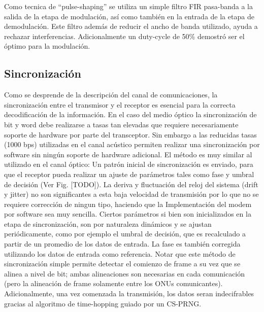 Como tecnica de ``pulse-shaping'' se utiliza un simple filtro FIR pasa-banda a la salida de la etapa de modulación, así como también en la entrada de la etapa de demodulación. Este filtro además de reducir el ancho de banda utilizado, ayuda a rechazar interferencias.
Adicionalmente un duty-cycle de 50\% demostró ser el óptimo para la modulación.

\subsection{Sincronización}
Como se desprende de la descripción del canal de comunicaciones, la sincronización entre el transmisor y el receptor es esencial para la correcta decodificación de la información. 
En el caso del medio óptico la sincronización de bit y word debe realizarse a tasas tan elevadas que requiere necesariamente soporte de hardware por parte del transceptor.
Sin embargo a las reducidas tasas (1000 bps) utilizadas en el canal acústico permiten realizar una sincronización por software sin ningún soporte de hardware adicional. 
El método es muy similar al utilizado en el canal óptico: Un patrón inicial de sincronización es enviado, para que el receptor pueda realizar un ajuste de parámetros tales como fase y umbral de decisión (Ver Fig. [TODO]). La deriva y fluctuación del reloj del sistema (drift y jitter) no son significantes a esta baja velocidad de transmisión por lo que no se requiere corrección de ningun tipo, haciendo que la Implementación del modem por software sea muy sencilla.
Ciertos parámetros si bien son inicializados en la etapa de sincronización, son por naturaleza dinámicos y se ajustan periódicamente, como por ejemplo el umbral de decisión, que es recalculado a partir de un promedio de los datos de entrada. La fase es también corregida utilizando los datos de entrada como referencia. Notar que este método de sincronización simple permite detectar el comienzo de frame a su vez que se alinea a nivel de bit; ambas alineaciones son necesarias en cada comunicación (pero la alineación de frame solamente entre los ONUs comunicantes). Adicionalmente, una vez comenzada la transmisión, los datos seran indecifrables gracias al algoritmo de time-hopping guiado por un CS-PRNG.

